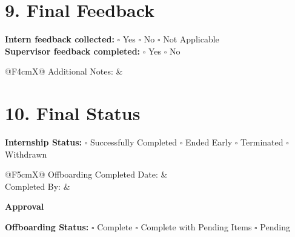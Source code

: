 \documentclass{paridyum}
\begin{document}
\section*{9. Final Feedback}
\textbf{Intern feedback collected:} \quad $\square$ Yes \quad $\square$ No \quad
$\square$ Not Applicable \\
\textbf{Supervisor feedback completed:} \quad $\square$ Yes \quad $\square$ No

\vspace{0.4em}
\begin{tabularx}{\linewidth}{@{}F{4cm}X@{}}
Additional Notes: & \dkblank
\end{tabularx}

\section*{10. Final Status}
\textbf{Internship Status:} \quad $\square$ Successfully Completed \quad
$\square$ Ended Early \quad $\square$ Terminated \quad $\square$ Withdrawn

\vspace{0.4em}
\begin{tabularx}{\linewidth}{@{}F{5cm}X@{}}
Offboarding Completed Date: & \dkblank \\[0.5em]
Completed By:               & \dkblank
\end{tabularx}

\vspace{1em}
\textbf{Approval}

\vspace{0.5em}
\paridyumofficers{\dkSigCeoName}{\dkSigCeoDesignation}{\dkSigCtoName}{\dkSigCtoDesignation}

\vspace{0.8em}
\textbf{Offboarding Status:} \quad $\square$ Complete \quad
$\square$ Complete with Pending Items \quad $\square$ Pending
\end{document}
